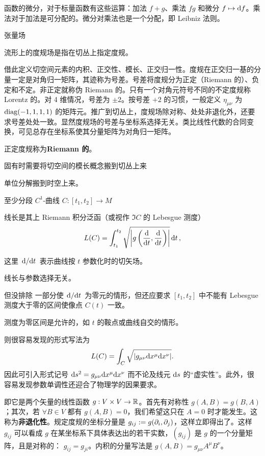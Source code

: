 函数的微分，对于标量函数有这些运算：加法 $f+g$、乘法 $fg$ 和微分 $f\mapsto\text df$。乘法对于加法是可分配的。微分对乘法也是一个分配，即 Leibniz 法则。

张量场

流形上的度规场是指在切丛上指定度规。

借此定义切空间元素的内积、正交性、模长、正交归一性。度规在正交归一基的分量一定是对角归一矩阵，其迹称为号差。号差将度规分为正定（Riemann 的）、负定和不定。非正定就称伪 Riemann 的。只有一个对角元符号不同的不定度规称 Lorentz 的。对 4 维情况，号差为 $\pm 2$。按号差 $+2$ 的习惯，一般定义 $\eta_{\mu\nu}$ 为 $\operatorname{diag}(-1,1,1,1)$ 的矩阵元。推广到切丛上，度规场除对称、处处非退化外，还要求号差处处一致。显然度规场的号差与坐标系选择无关。类比线性代数的合同变换，可见总存在坐标系使其分量矩阵为对角归一矩阵。

正定度规称为\textbf{Riemann 的}。

固有时需要将切空间的模长概念搬到切丛上来

单位分解搬到时空上来。

\begin{definition}
    至少分段 $C^1$-曲线 $C:[t_1,t_2]\to M$

线长是其上 Riemann 积分泛函（或视作 $\Im C$ 的 Lebesgue 测度）
    \[L(C)=\int_{t_1}^{t_2} \sqrt{\abs{g\left(\dv{t},\dv{t}\right)}}\dd{t},\]

    这里 $\dv*{t}$ 表示曲线按 $t$ 参数化时的切矢场。
\end{definition}

\begin{theorem}
    线长与参数选择无关。
\end{theorem}

\begin{remark}
    但没排除
    一部分使 $\dv*{t}$ 为零元的情形，但还应要求 $[t_1,t_2]$ 中不能有 Lebesgue 测度大于零的区间使像点 $C(t)$ 一致。
    
    测度为零区间是允许的，如 $t$ 的鞍点或曲线自交的情形。
\end{remark}
    
    则很容易发现的形式写法为
    \[
        L(C)=\int_C \sqrt{\abs{g_{\mu\nu}\dd x^\mu\dd x^\nu}}.
    \]
    因此可引入形式记号 $\dd s^2=g_{\mu\nu}\dd x^\mu\dd x^\nu$ 而不论及线元 $\dd s$ 的“虚实性”。此外，很容易发现参数单调性还迎合了物理学的因果要求。
    
即它是两个矢量的线性函数 $g:V\times V\to\mathbb{R}$。首先有对称性 $g(A,B)=g(B,A)$；其次，若 $\forall B\in V$ 都有 $g(A,B)=0$，我们希望这只在 $A=0$ 时才能发生。这称为\textbf{非退化性}。规定度规的坐标分量是 $g_{ij}:=g(\partial_i,\partial_j)$，这样立即得出了。这样 $g_{ij}$ 可以看成 $g$ 在某坐标系下具体表达出的若干实数，$(g_{ij})$ 是 $g$ 的一个分量矩阵，且是对称的：
 $g_{ij}=g_{ji}$。内积的分量写法是 $g( A, B)=g_{\mu\nu} A^\mu B^\nu$。
 
